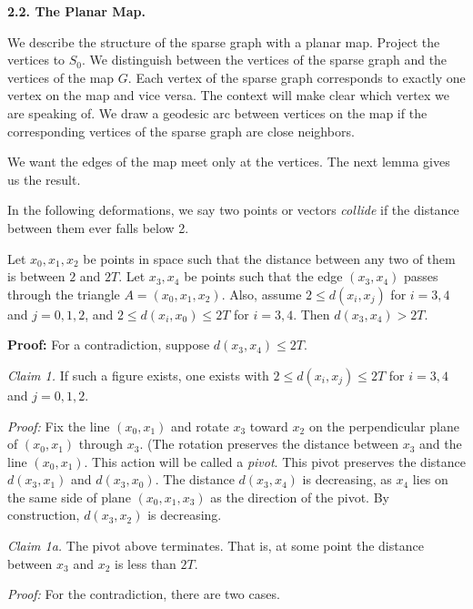 \bigskip

{\bf 2.2. The Planar Map.}

We describe the structure of the sparse graph with a planar map. 
Project the vertices to $S_0$.  We distinguish between the vertices of the sparse graph and 
the vertices of the map $G$.  Each vertex of the sparse graph corresponds to 
exactly one vertex on the map and vice versa.  The context will make clear 
which  vertex we are speaking of.  We draw a geodesic arc between 
vertices on the map if the corresponding vertices of the sparse graph 
are close neighbors.  

We want the edges of the map meet only at the vertices.  The next lemma 
gives us the result.

In the following deformations, we say two points or vectors {\it collide} if the distance between them
 ever falls below 2.

  Let $x_0,x_1,x_2$ be points in space such that 
the distance between any two of them is between $2$ and $2T$.
Let $x_3,x_4$ be points such that the edge 
$(x_3,x_4)$ passes through the triangle $A=(x_0,x_1,x_2)$.  
Also, assume $2\le d(x_i,x_j)$ for $i=3,4$ and $j=0,1,2$, and  
$2\le d(x_i,x_0)\le 2T$ for $i=3,4$.
Then $d(x_3,x_4)>2T$.
\endproclaim

{\bf Proof:} For a contradiction, suppose $d(x_3,x_4)\le 2T$.  

\smallskip

{\it Claim 1.} If such a figure exists, one exists with 
$2\le d(x_i,x_j)\le 2T$ for $i=3,4$ and $j=0,1,2$.

\smallskip

{\it Proof:} Fix the line $(x_0,x_1)$ and rotate $x_3$ toward $x_2$ on the perpendicular
 plane of $(x_0,x_1)$ through $x_3$.  (The rotation preserves the distance between $x_3$ and the line $(x_0,x_1)$.  This action will be called a {\it pivot}. 
 This pivot preserves the distance $d(x_3,x_1)$ and $d(x_3,x_0)$.  
The distance $d(x_3,x_4)$ is decreasing, as $x_4$ lies on the same side
of plane $(x_0,x_1,x_3)$ as the direction of the pivot.  By construction, $d(x_3,x_2)$ is decreasing.  

\smallskip

{\it Claim 1a.} The pivot above terminates.  That is, at some point the distance between 
$x_3$ and $x_2$ is less than $2T$.  

\smallskip

{\it Proof:} For the contradiction, there are two cases.  


